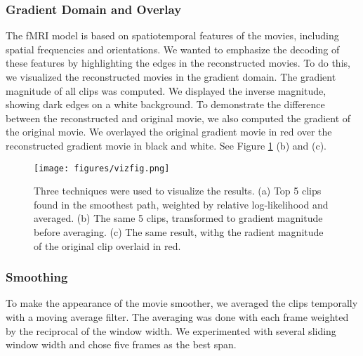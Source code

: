 \subsubsection{Gradient Domain and Overlay}
The fMRI model is based on spatiotemporal features of the movies, including spatial frequencies and orientations. We wanted to emphasize the decoding of these features by highlighting the edges in the reconstructed movies. To do this, we visualized the reconstructed movies in the gradient domain. The gradient magnitude of all clips was computed. We displayed the inverse magnitude, showing dark edges on a white background. To demonstrate the difference between the reconstructed and original movie, we also computed the gradient of the original movie. We overlayed the original gradient movie in red over the reconstructed gradient movie in black and white. See Figure \ref{fig:viz} (b) and (c).

\begin{figure}
\centering
    \texttt{[image: figures/vizfig.png]}
\caption{Three techniques were used to visualize the results. (a) Top 5 clips found in the smoothest path, weighted by relative log-likelihood and averaged. (b) The same 5 clips, transformed to gradient magnitude before averaging. (c) The same result, withg the radient magnitude of the original clip overlaid in red.}
\label{fig:viz}
\end{figure}

\subsubsection{Smoothing}
To make the appearance of the movie smoother, we averaged the clips temporally with a moving average filter. The averaging was done with each frame weighted by the reciprocal of the window width. We experimented with several sliding window width and chose five frames as the best span.